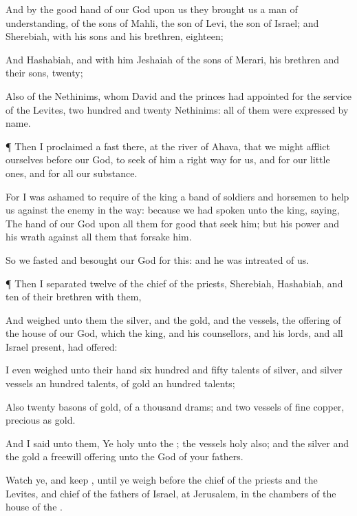 {And by the
good
hand of our
God upon us they
brought us a
man of
understanding, of the
sons of
Mahli, the
son of
Levi, the
son of
Israel; and
Sherebiah, with his
sons and his
brethren,
eighteen;

And
Hashabiah, and with him
Jeshaiah of the
sons of
Merari, his
brethren and their
sons,
twenty;

Also of the
Nethinims, whom
David and the
princes had
appointed for the
service of the
Levites, two
hundred and
twenty
Nethinims: all of them were
expressed by
name.


\par }{\PP {}¶ Then I
proclaimed a
fast there, at the
river of
Ahava, that we might
afflict ourselves
before our
God, to
seek of him a
right
way for us, and for our little
ones, and for all our
substance.

For I was
ashamed to
require of the
king a band of
soldiers and
horsemen to
help us against the
enemy in the
way: because we had
spoken unto the
king,
saying, The
hand of our
God
{} upon all them for
good that
seek him; but his
power and his
wrath
{} against all them that
forsake him.

So we
fasted and
besought our
God for this: and he was
intreated of us.


\par }{\PP {}¶ Then I
separated
twelve of the
chief of the
priests,
Sherebiah,
Hashabiah, and
ten of their
brethren with them,

And
weighed unto them the
silver, and the
gold, and the
vessels,
{} the
offering of the
house of our
God, which the
king, and his
counsellors, and his
lords, and all
Israel
{}
present, had
offered:

I even
weighed unto their
hand
six
hundred and
fifty
talents of
silver, and
silver
vessels an
hundred
talents,
{} of
gold an
hundred
talents;

Also
twenty
basons of
gold, of a
thousand
drams; and
two
vessels of
fine
copper,
precious as
gold.

And I
said unto them, Ye
{}
holy unto the
{}; the
vessels
{}
holy also; and the
silver and the
gold
{} a freewill
offering unto the
{}
God of your
fathers.

Watch ye, and
keep
{}, until ye
weigh
{}
before the
chief of the
priests and the
Levites, and
chief of the
fathers of
Israel, at
Jerusalem, in the
chambers of the
house of the
{}.

}
